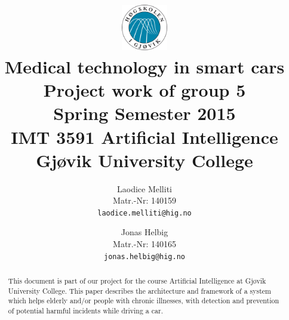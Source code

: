 \documentclass[a4paper]{article}		%
\title{									%
	\includegraphics[height=2cm]{images/higlogo}\\\vspace{1cm}	%
	Medical technology in smart cars\\\vspace{7mm}
	\Large{Project work of group 5}\\\vspace{5mm}			%
	\normalsize{Spring Semester 2015}\\\vspace{1cm}			
	\large{IMT 3591 Artificial Intelligence\\
		Gj\o{}vik University College
		\\\vspace{1cm}}}
\author{			%
Laodice Melliti\\
Matr.-Nr: 140159\\
{\tt laodice.melliti@hig.no}
\and 
Jonas Helbig\\
Matr.-Nr: 140165\\
{\tt jonas.helbig@hig.no}
\vspace{1cm}}
\begin{document}
	
\maketitle				%
\thispagestyle{empty} 	%
\begin{abstract}		%
	This document is part of our project for the course Artificial Intelligence at Gj\o{}vik University College. This paper describes the architecture and framework of a system which helps elderly and/or people with chronic illnesses, with detection and prevention of potential harmful incidents while driving a car. 
\end{abstract}

\newpage				%
\tableofcontents		%
\newpage



\newpage	%
\end{document}
